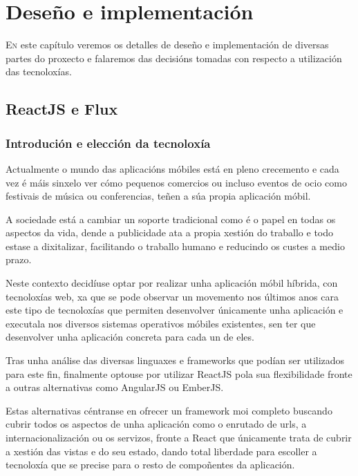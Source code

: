 \chapter{Deseño e implementación}
\minitoc


  \lettrine{E}{n} este capítulo veremos os detalles de deseño e implementación 
de diversas partes do proxecto e falaremos das decisións tomadas con 
respecto a utilización das tecnoloxías.

  \section{ReactJS e Flux}
    \subsection{Introdución e elección da tecnoloxía}
    Actualmente o mundo das aplicacións móbiles está en pleno crecemento e cada 
vez é máis sinxelo ver cómo pequenos comercios ou incluso eventos de ocio 
como festivais de música ou conferencias, teñen a súa propia aplicación móbil.

    A sociedade está a cambiar un soporte tradicional como é o papel en todas 
os aspectos da vida, dende a publicidade ata a propia xestión do traballo e 
todo estase a dixitalizar, facilitando o traballo humano e reducindo os custes a 
medio prazo.

    Neste contexto decidíuse optar por realizar unha aplicación móbil 
híbrida, con tecnoloxías web, xa que se pode observar un movemento nos últimos 
anos cara este tipo de tecnoloxías que permiten desenvolver únicamente unha 
aplicación e executala nos diversos sistemas operativos móbiles existentes, sen 
ter que desenvolver unha aplicación concreta para cada un de eles.

    Tras unha análise das diversas linguaxes e frameworks que podían 
ser utilizados para este fin, finalmente optouse por utilizar ReactJS pola sua 
flexibilidade fronte a outras alternativas como AngularJS ou EmberJS.

    Estas alternativas céntranse en ofrecer un framework moi completo buscando 
cubrir todos os aspectos de unha aplicación como o enrutado 
de urls, a internacionalización ou os servizos, fronte a React que únicamente 
trata de cubrir a xestión das vistas e do seu estado, dando total liberdade 
para escoller a tecnoloxía que se precise para o resto de compoñentes da 
aplicación.


